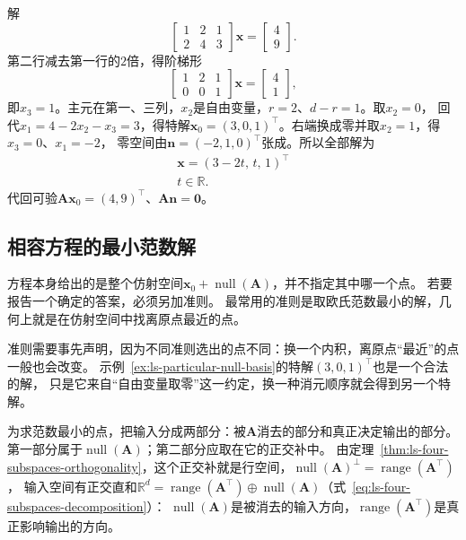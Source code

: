 \begin{example}[从阶梯形读出特解与零空间的基]
\label{ex:ls-particular-null-basis}
解
\[
 \begin{bmatrix}1&2&1\\2&4&3\end{bmatrix}\bm x=\begin{bmatrix}4\\9\end{bmatrix}.
\]
第二行减去第一行的$2$倍，得阶梯形
\[
 \begin{bmatrix}1&2&1\\0&0&1\end{bmatrix}\bm x=\begin{bmatrix}4\\1\end{bmatrix},
\]
即$x_3=1$。主元在第一、三列，$x_2$是自由变量，$r=2$、$d-r=1$。取$x_2=0$，
回代$x_1=4-2x_2-x_3=3$，得特解$\bm x_0=(3,0,1)^\top$。右端换成零并取$x_2=1$，得$x_3=0$、$x_1=-2$，
零空间由$\bm n=(-2,1,0)^\top$张成。所以全部解为
\[
\begin{gathered}
\bm x=(3-2t,\,t,\,1)^\top\\
t\in\mathbb R .
\end{gathered}
\]
代回可验$\bm A\bm x_0=(4,9)^\top$、$\bm A\bm n=\bm0$。
\end{example}

\subsection{相容方程的最小范数解}

方程本身给出的是整个仿射空间$\bm x_0+\operatorname{null}(\bm A)$，并不指定其中哪一个点。
若要报告一个确定的答案，必须另加准则。
最常用的准则是取欧氏范数最小的解，几何上就是在仿射空间中找离原点最近的点。

准则需要事先声明，因为不同准则选出的点不同：换一个内积，离原点“最近”的点一般也会改变。
示例~\ref{ex:ls-particular-null-basis}的特解$(3,0,1)^\top$也是一个合法的解，
只是它来自“自由变量取零”这一约定，换一种消元顺序就会得到另一个特解。

为求范数最小的点，把输入分成两部分：被$\bm A$消去的部分和真正决定输出的部分。
第一部分属于$\operatorname{null}(\bm A)$；第二部分应取在它的正交补中。
由定理~\ref{thm:ls-four-subspaces-orthogonality}，这个正交补就是行空间，$\operatorname{null}(\bm A)^\perp=\operatorname{range}(\bm A^\top)$，
输入空间有正交直和$\mathbb R^d=\operatorname{range}(\bm A^\top)\oplus\operatorname{null}(\bm A)$（式~\eqref{eq:ls-four-subspaces-decomposition}）：
$\operatorname{null}(\bm A)$是被消去的输入方向，$\operatorname{range}(\bm A^\top)$是真正影响输出的方向。

